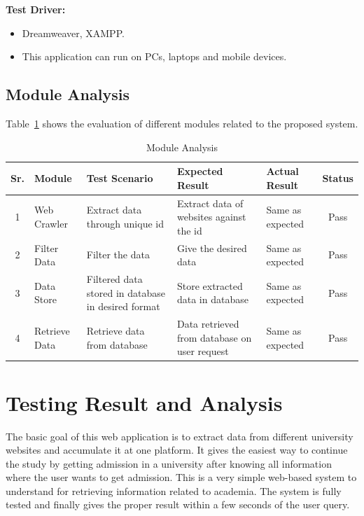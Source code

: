 \textbf{Test Driver:}
\begin{itemize}
    \item Dreamweaver, XAMPP.
    \item This application can run on PCs, laptops and mobile devices.
\end{itemize}

\subsection{Module Analysis}

Table~\ref{tab:module_analysis} shows the evaluation of different modules related to the proposed system.

\begin{table}[H]
\centering
\caption{Module Analysis}
\label{tab:module_analysis}
\begin{tabularx}{\textwidth}{|c|l|X|X|X|c|}
\hline
\textbf{Sr.} & \textbf{Module} & \textbf{Test Scenario} & \textbf{Expected Result} & \textbf{Actual Result} & \textbf{Status} \\
\hline
1 & Web Crawler & Extract data through unique id & Extract data of websites against the id & Same as expected & Pass \\
\hline
2 & Filter Data & Filter the data & Give the desired data & Same as expected & Pass \\
\hline
3 & Data Store & Filtered data stored in database in desired format & Store extracted data in database & Same as expected & Pass \\
\hline
4 & Retrieve Data & Retrieve data from database & Data retrieved from database on user request & Same as expected & Pass \\
\hline
\end{tabularx}
\end{table}

\section{Testing Result and Analysis}

The basic goal of this web application is to extract data from different university websites and accumulate it at one platform. It gives the easiest way to continue the study by getting admission in a university after knowing all information where the user wants to get admission. This is a very simple web-based system to understand for retrieving information related to academia. The system is fully tested and finally gives the proper result within a few seconds of the user query.
